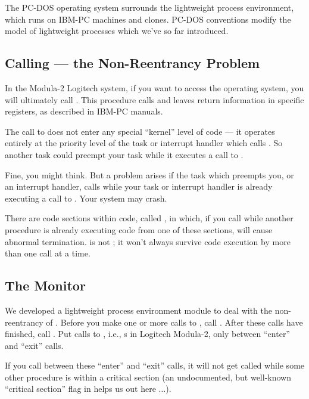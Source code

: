 The PC-DOS operating system surrounds the lightweight process
environment, which runs on IBM-PC machines and clones.  PC-DOS conventions
modify the model of lightweight processes which we've so far introduced.

\subsection{Calling  --- the Non-Reentrancy Problem}

In the Modula-2 Logitech system, if you want to access the operating system,
you will ultimately call .  This procedure calls
 and leaves return information in specific registers, as
described in IBM-PC manuals.

The call to  does not enter any special ``kernel'' level of code
--- it operates entirely at the priority level of the task or interrupt
handler which calls .  So another task could preempt your task
while it executes a call to .

Fine, you might think.  But a problem arises if the task which preempts
you, or an interrupt handler, calls  while your task or interrupt
handler is already executing a call to .  Your system may crash.

There are code sections within  code, called , in which, if you call  while another procedure is 
already executing code from one of these sections,  will cause 
abnormal termination.   is not
; it won't always survive code execution by more than
one call at a time.

\subsection{The  Monitor}

We developed a lightweight process environment module  to
deal with the non-reentrancy of .  Before you make one or more
calls to , call .  After these calls have
finished, call .  Put calls to , i.e.,
s in Logitech Modula-2, only between ``enter'' and 
``exit'' calls.

If you call  between these ``enter'' and ``exit'' calls, 
it will not get called while some other procedure is within a
critical section (an undocumented, but well-known ``critical section'' flag
in  helps us out here $\ldots$).

